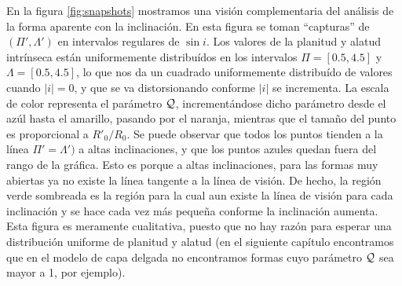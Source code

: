 En la figura \ref{fig:snapshots} mostramos una visión complementaria del análisis de la forma aparente con la inclinación. En esta figura se toman ``capturas'' de $(\Pi', \Lambda')$ en intervalos regulares de $\sin i$. Los valores de la planitud y alatud intrínseca están uniformemente distribuídos en los intervalos $\Pi = [0.5, 4.5]$ y $\Lambda = [0.5, 4.5]$, lo que nos da un cuadrado uniformemente distribuído de valores cuando $|i| = 0$, y que se va distorsionando conforme $|i|$ se incrementa. La escala de color representa el parámetro $\mathcal{Q}$, incrementándose dicho parámetro desde el azúl hasta el amarillo, pasando por el naranja, mientras que el tamaño del punto es proporcional a $R'_0/R_0$. Se puede observar que todos los puntos tienden a la línea $\Pi' = \Lambda')$ a altas inclinaciones, y que los puntos azules quedan fuera del rango de la gráfica. Esto es porque a altas inclinaciones, para las formas muy abiertas ya no existe la línea tangente a la línea de visión. De hecho, la región verde sombreada es la región para la cual aun existe la línea de visión para cada inclinación y se hace cada vez más pequeña conforme la inclinación aumenta. Esta figura es meramente cualitativa, puesto que no hay razón para esperar una distribución uniforme de planitud y alatud (en el siguiente capítulo encontramos que en el modelo de capa delgada no encontramos formas cuyo parámetro $\mathcal{Q}$ sea mayor a 1, por ejemplo).

